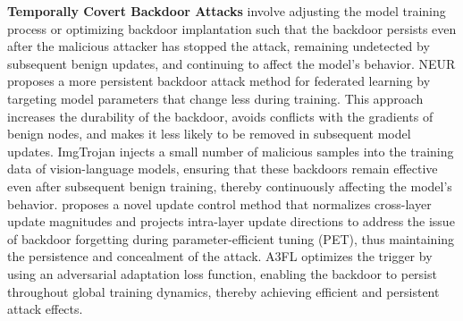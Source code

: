\documentclass[lettersize,journal]{IEEEtran}
\begin{document}
\textbf{Temporally Covert Backdoor Attacks} involve adjusting the model training process or optimizing backdoor implantation such that the backdoor persists even after the malicious attacker has stopped the attack, remaining undetected by subsequent benign updates, and continuing to affect the model’s behavior. NEUR\cite{zhang2022neurotoxin} proposes a more persistent backdoor attack method for federated learning by targeting model parameters that change less during training. This approach increases the durability of the backdoor, avoids conflicts with the gradients of benign nodes, and makes it less likely to be removed in subsequent model updates. ImgTrojan \cite{tao2024imgtrojan} injects a small number of malicious samples into the training data of vision-language models, ensuring that these backdoors remain effective even after subsequent benign training, thereby continuously affecting the model's behavior. \cite{gu2023gradient} proposes a novel update control method that normalizes cross-layer update magnitudes and projects intra-layer update directions to address the issue of backdoor forgetting during parameter-efficient tuning (PET), thus maintaining the persistence and concealment of the attack. A3FL \cite{zhang2024a3fl} optimizes the trigger by using an adversarial adaptation loss function, enabling the backdoor to persist throughout global training dynamics, thereby achieving efficient and persistent attack effects.
\end{document}
